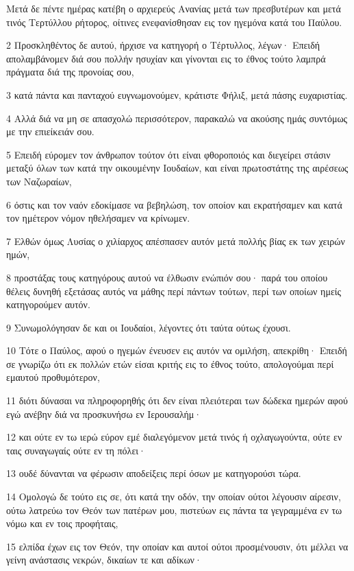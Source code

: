 \par Μετά δε πέντε ημέρας κατέβη ο αρχιερεύς Ανανίας μετά των πρεσβυτέρων και μετά τινός Τερτύλλου ρήτορος, οίτινες ενεφανίσθησαν εις τον ηγεμόνα κατά του Παύλου.
\par 2 Προσκληθέντος δε αυτού, ήρχισε να κατηγορή ο Τέρτυλλος, λέγων· Επειδή απολαμβάνομεν διά σου πολλήν ησυχίαν και γίνονται εις το έθνος τούτο λαμπρά πράγματα διά της προνοίας σου,
\par 3 κατά πάντα και πανταχού ευγνωμονούμεν, κράτιστε Φήλιξ, μετά πάσης ευχαριστίας.
\par 4 Αλλά διά να μη σε απασχολώ περισσότερον, παρακαλώ να ακούσης ημάς συντόμως με την επιείκειάν σου.
\par 5 Επειδή εύρομεν τον άνθρωπον τούτον ότι είναι φθοροποιός και διεγείρει στάσιν μεταξύ όλων των κατά την οικουμένην Ιουδαίων, και είναι πρωτοστάτης της αιρέσεως των Ναζωραίων,
\par 6 όστις και τον ναόν εδοκίμασε να βεβηλώση, τον οποίον και εκρατήσαμεν και κατά τον ημέτερον νόμον ηθελήσαμεν να κρίνωμεν.
\par 7 Ελθών όμως Λυσίας ο χιλίαρχος απέσπασεν αυτόν μετά πολλής βίας εκ των χειρών ημών,
\par 8 προστάξας τους κατηγόρους αυτού να έλθωσιν ενώπιόν σου· παρά του οποίου θέλεις δυνηθή εξετάσας αυτός να μάθης περί πάντων τούτων, περί των οποίων ημείς κατηγορούμεν αυτόν.
\par 9 Συνωμολόγησαν δε και οι Ιουδαίοι, λέγοντες ότι ταύτα ούτως έχουσι.
\par 10 Τότε ο Παύλος, αφού ο ηγεμών ένευσεν εις αυτόν να ομιλήση, απεκρίθη· Επειδή σε γνωρίζω ότι εκ πολλών ετών είσαι κριτής εις το έθνος τούτο, απολογούμαι περί εμαυτού προθυμότερον,
\par 11 διότι δύνασαι να πληροφορηθής ότι δεν είναι πλειότεραι των δώδεκα ημερών αφού εγώ ανέβην διά να προσκυνήσω εν Ιερουσαλήμ·
\par 12 και ούτε εν τω ιερώ εύρον εμέ διαλεγόμενον μετά τινός ή οχλαγωγούντα, ούτε εν ταις συναγωγαίς ούτε εν τη πόλει·
\par 13 ουδέ δύνανται να φέρωσιν αποδείξεις περί όσων με κατηγορούσι τώρα.
\par 14 Ομολογώ δε τούτο εις σε, ότι κατά την οδόν, την οποίαν ούτοι λέγουσιν αίρεσιν, ούτω λατρεύω τον Θεόν των πατέρων μου, πιστεύων εις πάντα τα γεγραμμένα εν τω νόμω και εν τοις προφήταις,
\par 15 ελπίδα έχων εις τον Θεόν, την οποίαν και αυτοί ούτοι προσμένουσιν, ότι μέλλει να γείνη ανάστασις νεκρών, δικαίων τε και αδίκων·
